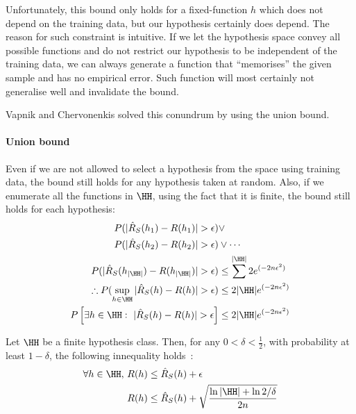 Unfortunately, this bound only holds for a fixed-function \(h\) which does not depend on the training data, but our hypothesis certainly does depend. The reason for such constraint is intuitive. If we let the hypothesis space convey all possible functions and do not restrict our hypothesis to be independent of the training data, we can always generate a function that ``memorises'' the given sample and has no empirical error. Such function will most certainly not generalise well and invalidate the bound.

Vapnik and Chervonenkis solved this conundrum by using the union bound.

\paragraph{Union bound} Even if we are not allowed to select a hypothesis from the space using training data, the bound still holds for any hypothesis taken at random. Also, if we enumerate all the functions in \(\HH\), using the fact that it is finite, the bound still holds for each hypothesis:
\begin{align}
	P(|\hat{R}_{S}(h_1) - R(h_1) | > \epsilon) &\lor \nonumber \\
	P(|\hat{R}_{S}(h_2)-R(h_2)| > \epsilon) &\lor \cdots \nonumber \\
	P(|\hat{R}_{S}(h_{|\HH|})-R(h_{|\HH|})| > \epsilon) &\leq \sum^{|\HH|} 2 e^{(-2n\epsilon^2)} \\
	\therefore P(\sup_{h \in \HH}|\hat{R}_{S}(h) - R(h)| >\epsilon) &\leq 2 |\HH| e^{(-2n\epsilon^2)}\\
	P\left[ \exists h \in \HH:~|\hat{R}_{S}(h) - R(h)| >\epsilon\right] &\leq 2 |\HH| e^{(-2n\epsilon^2)}
\label{eq:union_bound} \end{align}
\begin{theorem}\label{thrm:finite-inconsistent}
	Let \(\HH\) be a finite hypothesis class. Then, for any \(0 < \delta < \tfrac{1}{2}\), with probability at least \(1-\delta\), the following innequality holds~\cite{mohri:2012}:
	\begin{align}
		\forall h \in \HH,~&R(h)\leq \hat{R}_{S}(h) + \epsilon \nonumber \\
		&R(h)\leq \hat{R}_{S}(h) + \sqrt{\frac{\ln{|\HH|}+ \ln{2/\delta}}{2n}}
	\end{align}
\end{theorem}
